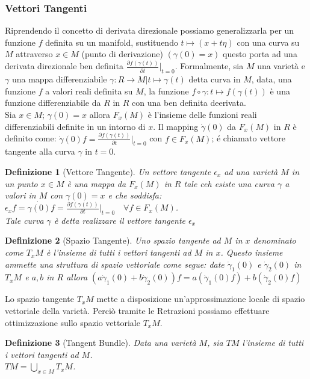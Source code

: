 \documentclass[a4paper, 12pt]{article}
\newtheorem{definition}{Definizione}
\begin{document}
\subsubsection{Vettori Tangenti}
Riprendendo il concetto di derivata direzionale possiamo generalizzarla per un funzione $f$ definita su un manifold, sustituendo $t \mapsto (x + t\eta)$ con una curva su $M$ attraverso $x \in M$ (punto di derivazione) $(\gamma (0) = x)$ questo porta ad una derivata direzionale ben definita $\frac{\partial f(\gamma (t))}{\partial t} \vert_{t=0}$. Formalmente, sia $M$ una varietà e $\gamma$ una mappa differenziabile $\gamma : R \to M | t \mapsto \gamma (t)$ detta curva in $M$, data, una funzione $f$ a valori reali definita su $M$, la funzione $f \circ \gamma : t \mapsto f(\gamma (t))$ è una funzione differenziabile da $R$ in $R$ con una ben definita deerivata.\\
Sia $x \in M$; $\gamma (0) = x$ allora $F_{x}(M)$ è l'insieme delle funzioni reali differenziabili definite in un intorno di $x$. Il mapping $\dot{\gamma} (0)$ da $F_x(M)$ in $R$ è definito come: $\dot{\gamma} (0) f = \frac{\partial f(\gamma (t))}{\partial t} \vert_{t=0}$ con $f \in F_x(M)$; é chiamato vettore tangente alla curva $\gamma$ in $t=0$.
\begin{definition}[Vettore Tangente]
Un vettore tangente $\epsilon_x$ ad una varietà $M$ in un punto $x \in M$ è una mappa da $F_x(M)$ in $R$ tale ceh esiste una curva $\gamma$ a valori in $M$ con $\gamma (0) = x$ e che soddisfa:\\
$\epsilon_xf = \dot{\gamma (0)} f = \frac{\partial f(\gamma (t))}{\partial t} \vert_{t=0} \quad \forall f \in F_x(M)$.\\
Tale curva $\gamma$ è detta realizzare il vettore tangente $\epsilon_x$
\end{definition}
\begin{definition}[Spazio Tangente]
Uno spazio tangente ad $M$ in $x$ denominato come $T_xM$ è l'insieme di tutti i vettori tangenti ad $M$ in $x$. Questo insieme ammette una struttura di spazio vettoriale come segue: date $\dot{\gamma}_1 (0)$ e $\dot{\gamma}_2 (0)$ in $T_xM$ e $a, b$ in $R$ allora $(a \dot{\gamma}_1 (0) + b \dot{\gamma}_2 (0)) f = a (\dot{\gamma}_1 (0) f) + b (\dot{\gamma}_2 (0) f)$
\end{definition}
Lo spazio tangente $T_xM$ mette a disposizione un'approssimazione locale di spazio vettoriale della varietà. Perciò tramite le Retrazioni possiamo effettuare ottimizzazione sullo spazio vettoriale $T_xM$.
\begin{definition}[Tangent Bundle]
Data una varietà $M$, sia $TM$ l'insieme di tutti i vettori tangenti ad $M$.\\
$TM = \bigcup_{x \in M} T_xM$.
\end{definition}
\end{document}
